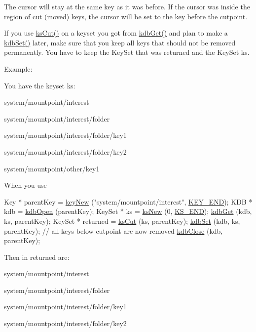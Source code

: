 The cursor will stay at the same key as it was before. If the cursor was inside the region of cut (moved) keys, the cursor will be set to the key before the cutpoint.

If you use \hyperlink{group__keyset_ga6b00cf82b59af4d883a9bad6cf4a4a4a}{ks\+Cut()} on a keyset you got from \hyperlink{group__kdb_ga28e385fd9cb7ccfe0b2f1ed2f62453a1}{kdb\+Get()} and plan to make a \hyperlink{group__kdb_ga11436b058408f83d303ca5e996832bcf}{kdb\+Set()} later, make sure that you keep all keys that should not be removed permanently. You have to keep the Key\+Set that was returned and the Key\+Set {\ttfamily ks}.

\begin{DoxyParagraph}{Example\+:}

\end{DoxyParagraph}
You have the keyset {\ttfamily ks\+:} 
\begin{DoxyItemize}
\item {\ttfamily system/mountpoint/interest} 
\item {\ttfamily system/mountpoint/interest/folder} 
\item {\ttfamily system/mountpoint/interest/folder/key1} 
\item {\ttfamily system/mountpoint/interest/folder/key2} 
\item {\ttfamily system/mountpoint/other/key1} 
\end{DoxyItemize}

When you use 
\begin{DoxyCodeInclude}
        Key * parentKey = \hyperlink{group__key_gad23c65b44bf48d773759e1f9a4d43b89}{keyNew} (\textcolor{stringliteral}{"system/mountpoint/interest"}, \hyperlink{group__key_gga9b703ca49f48b482def322b77d3e6bc8aa8adb6fcb92dec58fb19410eacfdd403}{KEY\_END});
        KDB * kdb = \hyperlink{group__kdb_ga6808defe5870f328dd17910aacbdc6ca}{kdbOpen} (parentKey);
        KeySet * ks = \hyperlink{group__keyset_ga671e1aaee3ae9dc13b4834a4ddbd2c3c}{ksNew} (0, \hyperlink{group__keyset_ga7a28fce3773b2c873c94ac80b8b4cd54}{KS\_END});
        \hyperlink{group__kdb_ga28e385fd9cb7ccfe0b2f1ed2f62453a1}{kdbGet} (kdb, ks, parentKey);
        KeySet * returned = \hyperlink{group__keyset_ga6b00cf82b59af4d883a9bad6cf4a4a4a}{ksCut} (ks, parentKey);
        \hyperlink{group__kdb_ga11436b058408f83d303ca5e996832bcf}{kdbSet} (kdb, ks, parentKey); \textcolor{comment}{// all keys below cutpoint are now removed}
        \hyperlink{group__kdb_gadb54dc9fda17ee07deb9444df745c96f}{kdbClose} (kdb, parentKey);
\end{DoxyCodeInclude}
 Then in {\ttfamily returned} are\+:
\begin{DoxyItemize}
\item {\ttfamily system/mountpoint/interest} 
\item {\ttfamily system/mountpoint/interest/folder} 
\item {\ttfamily system/mountpoint/interest/folder/key1} 
\item {\ttfamily system/mountpoint/interest/folder/key2} 
\end{DoxyItemize}

